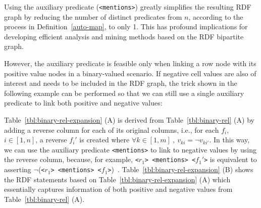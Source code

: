 Using the auxiliary predicate (\texttt{<mentions>}) greatly simplifies the resulting RDF graph by reducing the number of distinct predicates from $n$, according to the process in Definition~\ref{auto-map}, to only 1. This has profound implications for developing efficient analysis and mining methods based on the RDF bipartite graph.

However, the auxiliary predicate is feasible only when linking a row node with its positive value nodes in a binary-valued scenario. If negative cell values are also of interest and needs to be included in the RDF graph, the trick shown in the following example can be performed so that we can still use a single auxiliary predicate to link both positive and negative values:

\begin{myexp}
\label{binary-reverse}
Table~\ref{tbl:binary-rel-expansion} (A) is derived from Table~\ref{tbl:binary-rel} (A) by adding a reverse column for each of its original columns, i.e., for each $f_i$, $i \in [1, n]$, a reverse $f_i'$ is created where $\forall{k\in[1,m]}~,~ v_{ki} = \neg v_{ki'}$. In this way, we can use the auxiliary predicate \texttt{<mentions>} to link to negative values by using the reverse column, because, for example, \texttt{<$r_1$> <mentions> <$f_1'$>} is equivalent to asserting $\neg$(\texttt{<$r_1$> <mentions> <$f_1$>})~. Table~\ref{tbl:binary-rel-expansion} (B) shows the RDF statements based on Table~\ref{tbl:binary-rel-expansion} (A) which essentially captures information of both positive and negative values from Table~\ref{tbl:binary-rel} (A).
\end{myexp}

